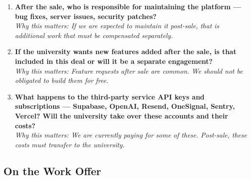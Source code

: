 \documentclass[12pt,a4paper]{article}
\begin{document}
\begin{enumerate}[leftmargin=*, label=\textbf{Q\arabic*.}, resume]

    \item \textbf{After the sale, who is responsible for maintaining the platform — bug fixes, server issues, security patches?}\\
    \textit{Why this matters: If we are expected to maintain it post-sale, that is additional work that must be compensated separately.}

    \item \textbf{If the university wants new features added after the sale, is that included in this deal or will it be a separate engagement?}\\
    \textit{Why this matters: Feature requests after sale are common. We should not be obligated to build them for free.}

    \item \textbf{What happens to the third-party service API keys and subscriptions — Supabase, OpenAI, Resend, OneSignal, Sentry, Vercel? Will the university take over these accounts and their costs?}\\
    \textit{Why this matters: We are currently paying for some of these. Post-sale, these costs must transfer to the university.}

\end{enumerate}

\subsection{On the Work Offer}
\end{document}
